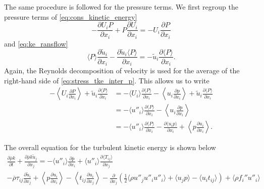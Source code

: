 \documentclass[oneside,a4paper,11pt]{report}
\newcommand{\rhoavg}{\overline{\rho}}
\newcommand{\pavg}{\overline{p}}
\newcommand{\rs}{\tau}          %
\newcommand{\uiavg}{\langle U_i \rangle}
\newcommand{\uifluc}{u_i}
\newcommand{\ujfluc}{u_j}
\newcommand{\uavgf}{\widetilde{u}}
\newcommand{\uflucf}{u''}
\begin{document}
The same procedure is followed for the pressure terms. We first regroup the pressure terms of \cref{eq:cons_kinetic_energy}
\begin{equation}
\label{eq:stress_tke_inter_p}
      -\frac{\partial U_i P }{\partial x_i} + P \frac{\partial U_i}{\partial x_i} =  -U_i \frac{\partial P }{\partial x_i}   
\end{equation}
and \cref{eq:ke_ransflow}
\begin{equation}
     \langle P \rangle \frac{ \partial \uavgf_i}{\partial x_i} - \frac{ \partial \uavgf_i \langle P \rangle }{\partial x_i} = -\uavgf_i \frac{ \partial \langle P \rangle}{\partial x_i}.    
\end{equation}
Again, the Reynolds decomposition of velocity is used for the average of the right-hand side of \cref{eq:stress_tke_inter_p}. This allows us to write
\begin{align}
-\left < U_i \frac{\partial P }{\partial x_i} \right > + \uavgf_i \frac{ \partial \langle P \rangle}{\partial x_i} & = -\uiavg \frac{\partial \langle P \rangle}{\partial x_i} - \left < \uifluc \frac{\partial p}{\partial x_i} \right > + \uavgf_i \frac{\partial \langle P \rangle}{\partial x_i} \nonumber \\
& = -\langle \uflucf_i \rangle \frac{\partial \langle P \rangle}{\partial x_i} - \left < \uifluc \frac{\partial p}{\partial x_i} \right > \nonumber \\
& = -\langle \uflucf_i \rangle \frac{\partial \langle P \rangle}{\partial x_i} - \frac{\partial \langle u_i p \rangle}{\partial x_i} + \left < p \frac{\partial u_i}{\partial x_i} \right >.
\end{align} 

The overall equation for the turbulent kinetic energy is shown below
\begin{multline}
\label{eq:ke_favre_conservation}
\frac{ \partial \rhoavg k }{ \partial t}  + \frac{ \partial \rhoavg k \uavgf_j }{ \partial x_j } = - \langle \uflucf_i \rangle \frac{ \partial \pavg }{ \partial x_i } + \langle \uflucf_i \rangle \frac{ \partial \langle T_{ij} \rangle }{ \partial x_j } \\
- \rhoavg \rs_{ij} \frac{ \partial \uavgf_i }{ \partial x_j}  + \left < p \frac{ \partial \uifluc } { \partial x_i } \right > - \left <  t_{ij} \frac{ \partial u_i }{ \partial x_j } \right > - \frac{\partial}{ \partial x_j} \left ( \frac{1}{2} \langle \rho \uflucf_j \uflucf_i \uflucf_i \rangle + \langle \ujfluc p \rangle  - \langle \uifluc t_{ij} \rangle \right ) + \langle \rho f_i'' \uflucf_i \rangle
\end{multline}
\end{document}
